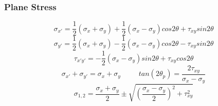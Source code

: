 \documentclass[twocolumn, 12pt]{article}    %
\begin{document}
\subsubsection*{Plane Stress}
\begin{equation*}
    \sigma_{x'} =\frac{1}{2}(\sigma_x+\sigma_y) + \frac{1}{2}(\sigma_x-\sigma_y) cos2\theta +\tau_{xy}sin2\theta
\end{equation*}
\begin{equation*}
    \sigma_{y'} =\frac{1}{2}(\sigma_x+\sigma_y) - \frac{1}{2}(\sigma_x-\sigma_y) cos2\theta -\tau_{xy}sin2\theta
\end{equation*}
\begin{equation*}
    \tau_{x'y'} =-\frac{1}{2}(\sigma_x-\sigma_y) sin2\theta +\tau_{xy}cos2\theta
\end{equation*}
\begin{equation*}
    \sigma_{x'}+\sigma_{y'}=\sigma_x+\sigma_y \hspace{30pt} tan(2\theta_p)= \frac{2\tau_{xy}}{\sigma_x-\sigma_y}
\end{equation*}
\begin{equation*}
    \sigma_{1,2} =\frac{\sigma_x+\sigma_y}{2} \pm \sqrt{\left(\frac{\sigma_x-\sigma_y}{2}\right)^2 +\tau_{xy}^2} 
\end{equation*}
\end{document}
